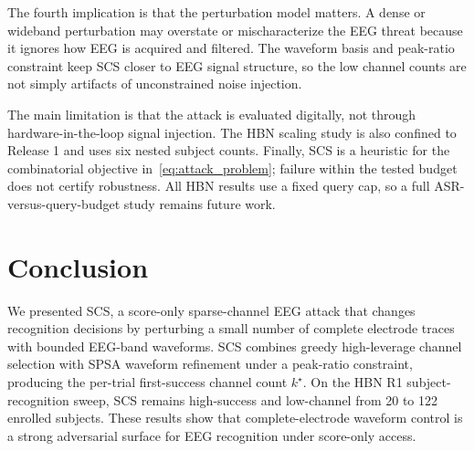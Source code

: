 \documentclass[journal]{IEEEtran}
\begin{document}
The fourth implication is that the perturbation model matters. A dense or wideband perturbation may overstate or mischaracterize the EEG threat because it ignores how EEG is acquired and filtered. The waveform basis and peak-ratio constraint keep SCS closer to EEG signal structure, so the low channel counts are not simply artifacts of unconstrained noise injection.

The main limitation is that the attack is evaluated digitally, not through hardware-in-the-loop signal injection. The HBN scaling study is also confined to Release 1 and uses six nested subject counts. Finally, SCS is a heuristic for the combinatorial objective in~\eqref{eq:attack_problem}; failure within the tested budget does not certify robustness. All HBN results use a fixed query cap, so a full ASR-versus-query-budget study remains future work.

\section{Conclusion}

We presented SCS, a score-only sparse-channel EEG attack that changes recognition decisions by perturbing a small number of complete electrode traces with bounded EEG-band waveforms. SCS combines greedy high-leverage channel selection with SPSA waveform refinement under a peak-ratio constraint, producing the per-trial first-success channel count $k^\star$. On the HBN R1 subject-recognition sweep, SCS remains high-success and low-channel from 20 to 122 enrolled subjects. These results show that complete-electrode waveform control is a strong adversarial surface for EEG recognition under score-only access.



\end{document}
